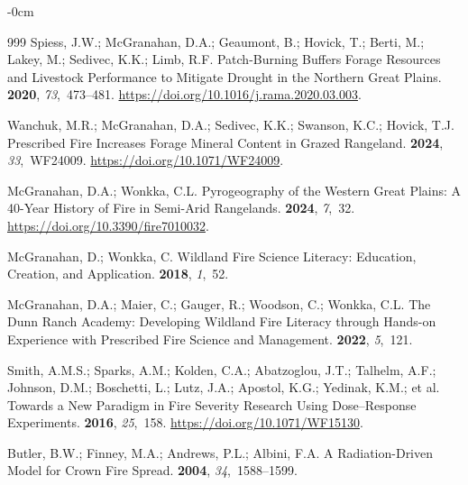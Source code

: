 \documentclass[fire,article,accept,oneauthor,pdftex]{Definitions/mdpi}
\begin{document}
\begin{adjustwidth}{-\extralength}{0cm}
\begin{thebibliography}{999}
Spiess, J.W.; McGranahan, D.A.; Geaumont, B.; Hovick, T.; Berti, M.; Lakey, M.;
  Sedivec, K.K.; Limb, R.F.
\newblock Patch-Burning Buffers Forage Resources and Livestock Performance to
  Mitigate Drought in the Northern {{Great Plains}}.
 {\bf 2020}, {\em 73},~473--481.
\newblock
  \url{https://doi.org/10.1016/j.rama.2020.03.003}.

Wanchuk, M.R.; McGranahan, D.A.; Sedivec, K.K.; Swanson, K.C.; Hovick, T.J.
\newblock Prescribed Fire Increases Forage Mineral Content in Grazed Rangeland.
 {\bf 2024}, {\em
  33},~WF24009.
\newblock
  \url{https://doi.org/10.1071/WF24009}.

McGranahan, D.A.; Wonkka, C.L.
\newblock Pyrogeography of the {{Western Great Plains}}: {{A}} 40-Year History
  of Fire in Semi-Arid Rangelands.
 {\bf 2024}, {\em 7},~32.
\newblock
  \url{https://doi.org/10.3390/fire7010032}.

McGranahan, D.; Wonkka, C.
\newblock Wildland {{Fire Science Literacy}}: {{Education}}, {{Creation}}, and
  {{Application}}.
 {\bf 2018}, {\em 1},~52.

McGranahan, D.A.; Maier, C.; Gauger, R.; Woodson, C.; Wonkka, C.L.
\newblock The {{Dunn Ranch Academy}}: Developing Wildland Fire Literacy through
  Hands-on Experience with Prescribed Fire Science and Management.
 {\bf 2022}, {\em 5},~121.

Smith, A.M.S.; Sparks, A.M.; Kolden, C.A.; Abatzoglou, J.T.; Talhelm, A.F.;
  Johnson, D.M.; Boschetti, L.; Lutz, J.A.; Apostol, K.G.; Yedinak, K.M.;
  et al.
\newblock Towards a New Paradigm in Fire Severity Research Using Dose--Response
  Experiments.
 {\bf 2016}, {\em
  25},~158.
\newblock
  \url{https://doi.org/10.1071/WF15130}.

Butler, B.W.; Finney, M.A.; Andrews, P.L.; Albini, F.A.
\newblock A Radiation-Driven Model for Crown Fire Spread.
 {\bf 2004}, {\em
  34},~1588--1599.


\end{thebibliography}
\end{adjustwidth}
\end{document}
